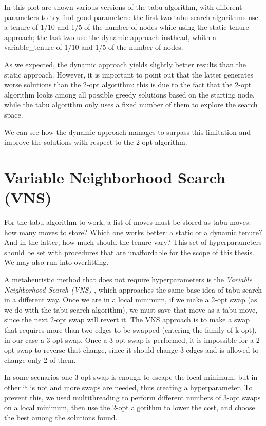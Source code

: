 In this plot are shown various versions of the tabu algorithm, with different parameters to try find good parameters: the first two tabu search algorithms use a tenure of 1/10 and 1/5 of the number of nodes while using the static tenure approach; the last two use the dynamic approach insthead, whith a variable\_tenure of 1/10 and 1/5 of the number of nodes.

As we expected, the dynamic approach yields slightly better results than the static approach. However, it is important to point out that the latter generates worse solutions than the 2-opt algorithm: this is due to the fact that the 2-opt algorithm looks among all possible greedy solutions based on the starting node, while the tabu algorithm only uses a fixed number of them to explore the search space.

We can see how the dynamic approach manages to surpass this limitation and improve the solutions with respect to the 2-opt algorithm.

\section{Variable Neighborhood Search (VNS)}

For the tabu algorithm to work, a list of moves must be stored as tabu moves: how many moves to store? Which one works better: a static or a dynamic tenure? And in the latter, how much should the tenure vary? This set of hyperparameters should be set with procedures that are unaffordable for the scope of this thesis. We may also run into overfitting.

A metaheuristic method that does not require hyperparameters is the \textit{Variable Neighborhood Search (VNS)} \cite{Hansen2019}, which approaches the same base idea of tabu search in a different way. Once we are in a local minimum, if we make a 2-opt swap (as we do with the tabu search algorithm), we must save that move as a tabu move, since the next 2-opt swap will revert it. The VNS approach is to make a swap that requires more than two edges to be swapped (entering the family of k-opt), in our case a 3-opt swap. Once a 3-opt swap is performed, it is impossible for a 2-opt swap to reverse that change, since it should change 3 edges and is allowed to change only 2 of them.

In some scenarios one 3-opt swap is enough to escape the local minimum, but in other it is not and more swaps are needed, thus creating a hyperparameter. To prevent this, we used multithreading to perform different numbers of 3-opt swaps on a local minimum, then use the 2-opt algorithm to lower the cost, and choose the best among the solutions found.

